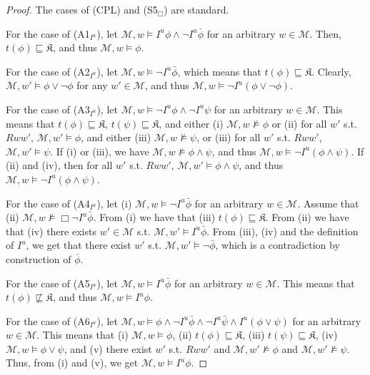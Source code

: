 \documentclass{article}
\begin{document}
\begin{proof}

The cases of (CPL) and (S5$_{\Box}$) are standard.

For the case of (A1$_{I^{u}}$), let $\mathcal{M}, w \models I^{u} \phi \wedge \neg I^{u}\bar{\phi}$ for an arbitrary $w \in \mathcal{M}$. Then, $t(\phi) \sqsubseteq \mathfrak{K}$, and thus $\mathcal{M}, w \models \phi$.

For the case of (A2$_{I^{u}}$), let $\mathcal{M}, w \models \neg I^{u} \bar{\phi}$, which means that $t(\phi) \sqsubseteq \mathfrak{K}$. Clearly, $\mathcal{M}, w' \models \phi \vee \neg \phi$ for any $w' \in \mathcal{M}$, and thus $\mathcal{M}, w \models \neg I^{u} (\phi \vee \neg \phi)$.




For the case of (A3$_{I^{u}}$), let $\mathcal{M}, w \models \neg I^{u} \phi \wedge \neg I^{u} \psi$ for an arbitrary $w \in \mathcal{M}$. This means that $t(\phi) \sqsubseteq \mathfrak{K}$, $t(\psi) \sqsubseteq \mathfrak{K}$, and either (i) $\mathcal{M}, w \not \models \phi$ or (ii) for all $w'$ s.t. $Rww'$, $\mathcal{M}, w' \models \phi$, and either (iii) $\mathcal{M}, w \not \models \psi$, or (iii) for all $w'$ s.t. $Rww'$, $\mathcal{M}, w' \models \psi$. If (i) or (iii), we have $\mathcal{M}, w \not \models \phi \wedge \psi$, and thus $\mathcal{M}, w \models \neg I^{u} (\phi \wedge \psi)$. If (ii) and (iv), then for all $w'$ s.t. $Rww'$, $\mathcal{M}, w' \models \phi \wedge \psi$, and thus $\mathcal{M}, w \models \neg I^{u} (\phi \wedge \psi)$.

For the case of (A4$_{I^{u}}$), let (i) $\mathcal{M}, w \models \neg I^{u} \bar{\phi}$ for an arbitrary $w \in \mathcal{M}$. Assume that (ii) $\mathcal{M}, w \not \models \Box \neg I^{u} \bar{\phi}$. From (i) we have that (iii) $t (\phi) \sqsubseteq \mathfrak{K}$. From (ii) we have that (iv) there exists $w' \in \mathcal{M}$ s.t. $\mathcal{M}, w' \models I^{u} \bar{\phi}$. From (iii), (iv) and the definition of $I^{u}$, we get that there exist $w'$ s.t. $\mathcal{M}, w' \models \neg \bar{\phi}$, which is a contradiction by construction of $\bar{\phi}$.

For the case of (A5$_{I^{u}}$), let $\mathcal{M}, w \models I^{u} \bar{\phi}$ for an arbitrary $w \in \mathcal{M}$. This means that $t(\phi) \not \sqsubseteq \mathfrak{K}$, and thus $\mathcal{M}, w \models I^{u} \phi$.

For the case of (A6$_{I^{u}}$), let $\mathcal{M}, w \models \phi \wedge \neg I^{u} \bar{\phi} \wedge \neg I^{u}\bar{\psi} \wedge I^{u}(\phi \vee \psi)$ for an arbitrary $w \in \mathcal{M}$. This means that (i) $\mathcal{M}, w \models \phi$, (ii) $t(\phi) \sqsubseteq \mathfrak{K}$, (iii) $t(\psi) \sqsubseteq \mathfrak{K}$, (iv) $\mathcal{M}, w \models \phi \vee \psi$, and (v) there exist $w'$ s.t. $Rww'$ and $\mathcal{M}, w' \not \models \phi$ and $\mathcal{M}, w' \not \models \psi$. Thus, from (i) and (v), we get $\mathcal{M}, w \models I^{u} \phi$.


\end{proof}
\end{document}
